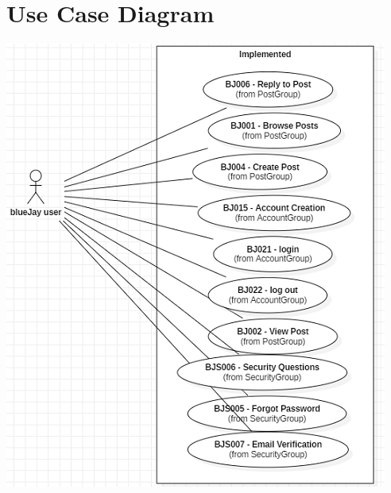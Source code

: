 \documentclass{report}
\begin{document}
\chapter{Use Case Diagram}
\label{app:use_case_diagram}
\includegraphics{UseCaseDiagram}
\end{document}
